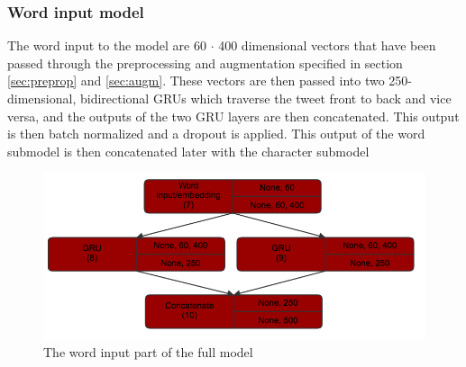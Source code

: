 \subsubsection{Word input model}
The word input to the model are 60  $\cdot$ 400 dimensional vectors that have been passed through the preprocessing and augmentation specified in section \ref{sec:preprop} and \ref{sec:augm}. These vectors are then passed into two 250-dimensional, bidirectional GRUs which traverse the tweet front to back and vice versa, and the outputs of the two GRU layers are then concatenated. This output is then batch normalized and a dropout is applied. This output of the word submodel is then concatenated later with the character submodel\\
\begin{figure}[H]
	\centering
		\includegraphics[scale=0.25]{pictures/word_model.png}
		\caption{The word input part of the full model}
		\label{fig:wordmodel}
\end{figure}
